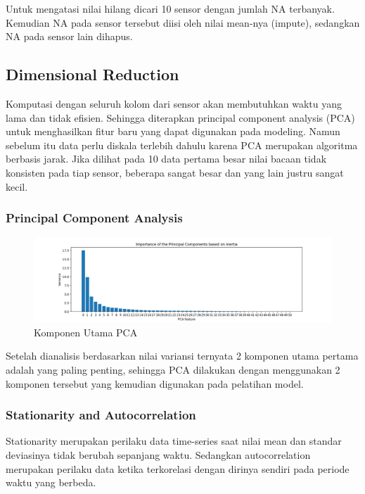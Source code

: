     Untuk mengatasi nilai hilang dicari 10 sensor dengan jumlah NA terbanyak. Kemudian NA pada sensor tersebut diisi oleh nilai mean-nya (impute), sedangkan NA pada sensor lain dihapus.

    \subsection{Dimensional Reduction}

    Komputasi dengan seluruh kolom dari sensor akan membutuhkan waktu yang lama dan tidak efisien. Sehingga diterapkan principal component analysis (PCA) untuk menghasilkan fitur baru yang dapat digunakan pada modeling. Namun sebelum itu data perlu diskala terlebih dahulu karena PCA merupakan algoritma berbasis jarak. Jika dilihat pada 10 data pertama besar nilai bacaan tidak konsisten pada tiap sensor, beberapa sangat besar dan yang lain justru sangat kecil.

        \subsubsection{Principal Component Analysis}

        \begin{figure}[h]
            \centering
            \includegraphics[width=\textwidth]{resources/Acuan/PCA_Plot.png}
            \caption{Komponen Utama PCA}
        \end{figure}

        Setelah dianalisis berdasarkan nilai variansi ternyata 2 komponen utama pertama adalah yang paling penting, sehingga PCA dilakukan dengan menggunakan 2 komponen tersebut yang kemudian digunakan pada pelatihan model.

        \subsubsection{Stationarity and Autocorrelation}

        Stationarity merupakan perilaku data time-series saat nilai mean dan standar deviasinya tidak berubah sepanjang waktu. Sedangkan autocorrelation merupakan perilaku data ketika terkorelasi dengan dirinya sendiri pada periode waktu yang berbeda.

